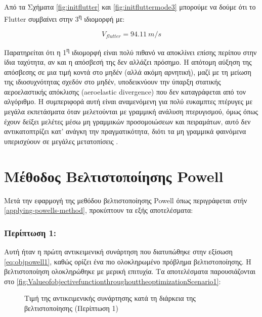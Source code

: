 Από τα Σχήματα \ref{fig:initflutter} και \ref{fig:initfluttermode3} μπορούμε να δούμε ότι το \textlatin{Flutter} συμβαίνει στην
3\textsuperscript{η} ιδιομορφή με:

\begin{equation}
V_{flutter} = 94.11\ m/s
\end{equation}

Παρατηρείται ότι η 1\textsuperscript{η} ιδιομορφή είναι πολύ πιθανό να αποκλίνει επίσης περίπου στην ίδια ταχύτητα, αν και η απόσβεσή της δεν αλλάζει πρόσημο. Η απότομη αύξηση της απόσβεσης σε μια τιμή κοντά στο μηδέν (αλλά ακόμη αρνητική), μαζί με τη μείωση της ιδιοσυχνότητας σχεδόν στο μηδέν, υποδεικνύουν την ύπαρξη στατικής αεροελαστικής απόκλισης (\textlatin{aeroelastic divergence}) που δεν καταγράφεται από τον αλγόριθμο. Η συμπεριφορά αυτή είναι αναμενόμενη για πολύ ευκαμπτες πτέρυγες με μεγάλα εκπετάσματα όταν μελετούνται με γραμμική ανάλυση πτερυγισμού, όμως όπως έχουν δείξει μελέτες μέσω μη γραμμικών προσομοιώσεων και πειραμάτων, αυτό δεν αντικατοπτρίζει κατ' ανάγκη την πραγματικότητα, διότι τα μη γραμμικά φαινόμενα υπερισχύουν σε μεγάλες μετατοπίσεις \cite{NonlinearAeroelasticStability}.

\section{Μέθοδος Βελτιστοποίησης \textlatin{Powell}}
\label{powells-optimization-method}

Μετά την εφαρμογή της μεθόδου βελτιστοποίησης \textlatin{Powell} όπως περιγράφεται στήν \autoref{applying-powells-method}, προκύπτουν τα εξής αποτελέσματα:

\subsubsection{Περίπτωση 1:}

Αυτή ήταν η πρώτη αντικειμενική συνάρτηση που διατυπώθηκε στην εξίσωση \eqref{eq:objpowell1}, καθώς ορίζει ένα πιο ολοκληρωμένο πρόβλημα βελτιστοποίησης. Η βελτιστοποίηση ολοκληρώθηκε με μερική επιτυχία. Τα αποτελέσματα παρουσιάζονται στο \autoref{fig:ValueofobjectivefunctionthroughouttheoptimizationScenario1}:

\begin{figure}[H]
    \centering
    
    \caption{Τιμή της αντικειμενικής συνάρτησης κατά τη διάρκεια της βελτιστοποίησης (Περίπτωση 1)}
    \label{fig:ValueofobjectivefunctionthroughouttheoptimizationScenario1}
\end{figure}


